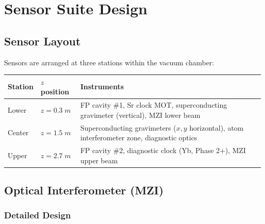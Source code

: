 \documentclass[11pt,a4paper]{article}
\begin{document}
\section{Sensor Suite Design}

\subsection{Sensor Layout}

Sensors are arranged at three stations within the vacuum chamber:

\begin{longtable}{p{}p{}p{}}
\toprule
\textbf{Station} & \textbf{$z$ position} & \textbf{Instruments} \\
\midrule
\endhead
Lower & $z = 0.3\;\si{m}$ & FP cavity \#1, Sr clock MOT,
superconducting gravimeter (vertical),
MZI lower beam \\
Center & $z = 1.5\;\si{m}$ & Superconducting gravimeters
($x,y$ horizontal), atom interferometer zone,
diagnostic optics \\
Upper & $z = 2.7\;\si{m}$ & FP cavity \#2, diagnostic clock
(Yb, Phase 2+), MZI upper beam \\
\bottomrule
\end{longtable}

\subsection{Optical Interferometer (MZI)}

\subsubsection{Detailed Design}
\end{document}
